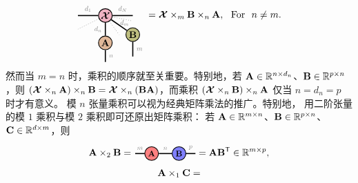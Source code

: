 \begin{enumerate}
$$\begin{tikzpicture}[baseline=-0.5ex]
    \tikzset{tensor/.style = {minimum size = 0.5cm,shape = circle,thick,draw=black,inner sep = 0pt}, edge/.style = {thick,line width=.4mm},every loop/.style={}}
    \def\x{0}
    \def\y{0}
    \node[tensor,fill=blue!20!red!30!white] (Xt) at (\x,\y) {$\Xt$};
    \node[tensor,fill=green!30!red!40!white] (A) at (\x,\y-1) {$\Ab$};
    \node[tensor,fill=green!50!red!50!white] (B) at (\x+1,\y-0.7) {$\Bb$};
    \draw[edge] (Xt) -- (\x-1,\y) node [midway,above] {\scalebox{0.7}{\dimcolor{$d_1$}}};
    \draw[dotted] (Xt) -- (\x-1,\y-0.5);
    \draw[edge] (Xt) -- (\x+1,\y) node [midway,above] {\scalebox{0.7}{\dimcolor{$d_N$}}};
    \node[draw=none] () at (\x+0.7,\y-0.27) {\scalebox{0.7}{\textcolor{gray}{$d_m$}}};
    \draw[edge] (Xt) -- (A) node [midway,left] {\scalebox{0.7}{\dimcolor{$d_n$}}};
    \draw[edge] (A) -- (\x,\y-1.7) node [midway,right] {\scalebox{0.7}{\textcolor{gray}{$n$}}};
    \draw[edge] (Xt) -- (B);
    \draw[edge] (B) -- (\x+1,\y-1.5) node [midway,right] {\scalebox{0.7}{\dimcolor{$m$}}};
    \draw[dotted] (Xt) -- (\x+1,\y-0.2);
    \draw[dotted] (Xt) -- (\x+0.5,\y-0.7);
    \end{tikzpicture}
= \Xt\ttm m\Bb\ttm n \Ab,~~\text{For}~~n\neq m.
$$
然而当 $m = n$ 时，乘积的顺序就至关重要。特别地，若 $\mathbf{A}\in\mathbb{R}^{n\times d_n}$、$\mathbf{B}\in\mathbb{R}^{p\times n}$，则 $(\bm{\mathcal{X}}\times_{n} \mathbf{A}) \times_{n} \mathbf{B} = \bm{\mathcal{X}}\times_{n}(\mathbf{B}\mathbf{A})$，而乘积 $(\bm{\mathcal{X}}\times_{n} \mathbf{B}) \times_{n} \mathbf{A}$ 仅当 $n=d_n=p$ 时才有意义。
模 $n$ 张量乘积可以视为经典矩阵乘法的推广。特别地，
用二阶张量的模 $1$ 乘积与模 $2$ 乘积即可还原出矩阵乘积：
若 $\mathbf{A}\in\mathbb{R}^{m\times n}$、$\mathbf{B}\in\mathbb{R}^{p\times n}$、$\mathbf{C}\in\mathbb{R}^{d\times m}$，则
\begin{align*}
\Ab\ttm2 \Bb
=
\begin{tikzpicture}[baseline=\baseline]
   \tikzset{tensor/.style = {minimum size = 0.5cm,shape = circle,thick,draw=black,inner sep = 0pt}, edge/.style = {thick,line width=.4mm},every loop/.style={}}
    \def\y{0}
    \def\x{0}
    \node[tensor,fill=red!50!white] (A) at (\x,\y){\scalebox{0.85}{$\Ab$}};
    \node[tensor,fill=blue!50!white] (B) at (\x+1,\y){\scalebox{0.85}{$\Bb$}};
    \draw[edge] (A) -- (B) node [above,midway] {\scalebox{0.7}{\dimcolor{$n$}}};
    \draw[edge] (\x-0.25,\y) -- (\x-0.6,\y)  node [midway,above] {\scalebox{0.7}{\dimcolor{$m$}}};
    \draw[edge] (\x+1.25,\y) -- (\x+1.6,\y)  node [midway,above] {\scalebox{0.7}{\dimcolor{$p$}}};
    \end{tikzpicture}
    = \Ab\Bb^\ts\in\RR^{m\times p},
\end{align*}
\begin{align*}
    \Ab\ttm1 \Cb =

\end{align*}
\end{enumerate}
